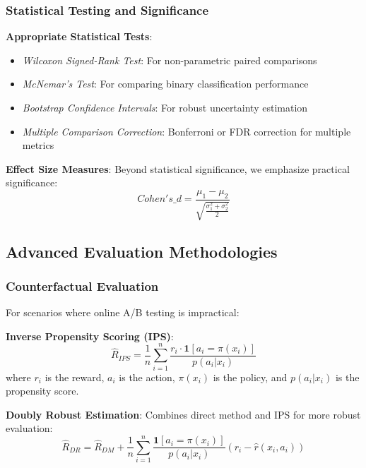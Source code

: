 \subsubsection{Statistical Testing and Significance}

\textbf{Appropriate Statistical Tests}:
\begin{itemize}
    \item \textit{Wilcoxon Signed-Rank Test}: For non-parametric paired comparisons
    \item \textit{McNemar's Test}: For comparing binary classification performance
    \item \textit{Bootstrap Confidence Intervals}: For robust uncertainty estimation
    \item \textit{Multiple Comparison Correction}: Bonferroni or FDR correction for multiple metrics
\end{itemize}

\textbf{Effect Size Measures}:
Beyond statistical significance, we emphasize practical significance:
\begin{equation}
Cohen's\_d = \frac{\mu_1 - \mu_2}{\sqrt{\frac{\sigma_1^2 + \sigma_2^2}{2}}}
\end{equation}

\subsection{Advanced Evaluation Methodologies}

\subsubsection{Counterfactual Evaluation}
For scenarios where online A/B testing is impractical:

\textbf{Inverse Propensity Scoring (IPS)}:
\begin{equation}
\hat{R}_{IPS} = \frac{1}{n}\sum_{i=1}^n \frac{r_i \cdot \mathbf{1}[a_i = \pi(x_i)]}{p(a_i|x_i)}
\end{equation}
where $r_i$ is the reward, $a_i$ is the action, $\pi(x_i)$ is the policy, and $p(a_i|x_i)$ is the propensity score.

\textbf{Doubly Robust Estimation}:
Combines direct method and IPS for more robust evaluation:
\begin{equation}
\hat{R}_{DR} = \hat{R}_{DM} + \frac{1}{n}\sum_{i=1}^n \frac{\mathbf{1}[a_i = \pi(x_i)]}{p(a_i|x_i)}(r_i - \hat{r}(x_i, a_i))
\end{equation}


